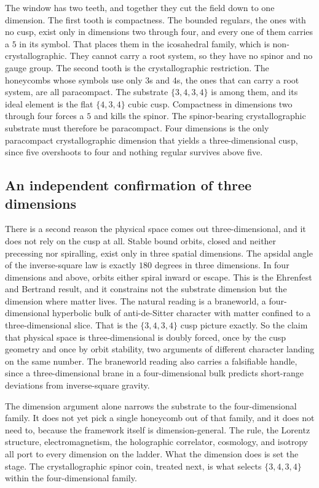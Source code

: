 The window has two teeth, and together they cut the field down to one dimension. The first tooth is compactness.
The bounded regulars, the ones with no cusp, exist only in dimensions two through four, and every one of them
carries a $5$ in its symbol. That places them in the icosahedral family, which is non-crystallographic. They
cannot carry a root system, so they have no spinor and no gauge group. The second tooth is the
crystallographic restriction. The honeycombs whose symbols use only $3$s and $4$s, the ones that can carry a
root system, are all paracompact. The substrate $\{3,4,3,4\}$ is among them, and its ideal element is the flat
$\{4,3,4\}$ cubic cusp. Compactness in dimensions two through four forces a $5$ and kills the spinor. The
spinor-bearing crystallographic substrate must therefore be paracompact. Four dimensions is the only paracompact
crystallographic dimension that yields a three-dimensional cusp, since five overshoots to four and nothing
regular survives above five.

\subsection{An independent confirmation of three dimensions}

There is a second reason the physical space comes out three-dimensional, and it does not rely on the cusp at all.
Stable bound orbits, closed and neither precessing nor spiralling, exist only in three spatial dimensions. The
apsidal angle of the inverse-square law is exactly $180$ degrees in three dimensions. In four dimensions and
above, orbits either spiral inward or escape. This is the Ehrenfest and Bertrand result, and it constrains not
the substrate dimension but the dimension where matter lives. The natural reading is a braneworld, a
four-dimensional hyperbolic bulk of anti-de-Sitter character with matter confined to a three-dimensional slice.
That is the $\{3,4,3,4\}$ cusp picture exactly. So the claim that physical space is three-dimensional is doubly
forced, once by the cusp geometry and once by orbit stability, two arguments of different character landing on
the same number. The braneworld reading also carries a falsifiable handle, since a three-dimensional brane in a
four-dimensional bulk predicts short-range deviations from inverse-square gravity.


The dimension argument alone narrows the substrate to the four-dimensional family. It does not yet pick a single
honeycomb out of that family, and it does not need to, because the framework itself is dimension-general. The
rule, the Lorentz structure, electromagnetism, the holographic correlator, cosmology, and isotropy all port to
every dimension on the ladder. What the dimension does is set the stage. The crystallographic spinor coin,
treated next, is what selects $\{3,4,3,4\}$ within the four-dimensional family.
